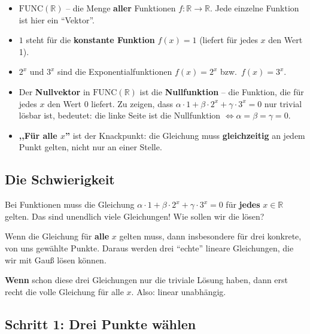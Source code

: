 \documentclass[a4paper,12pt]{article}
\begin{document}
\begin{begriffe}
\begin{itemize}[leftmargin=*, nosep]
    \item $\text{FUNC}(\mathbb{R})$ -- die Menge \textbf{aller} Funktionen $f : \mathbb{R} \to \mathbb{R}$. Jede einzelne Funktion ist hier ein ``Vektor''.
    \item $1$ steht f\"ur die \textbf{konstante Funktion} $f(x) = 1$ (liefert f\"ur jedes $x$ den Wert 1).
    \item $2^x$ und $3^x$ sind die Exponentialfunktionen $f(x) = 2^x$ bzw.\ $f(x) = 3^x$.
    \item Der \textbf{Nullvektor} in $\text{FUNC}(\mathbb{R})$ ist die \textbf{Nullfunktion} -- die Funktion, die f\"ur jedes $x$ den Wert 0 liefert. Zu zeigen, dass $\alpha \cdot 1 + \beta \cdot 2^x + \gamma \cdot 3^x = 0$ nur trivial l\"osbar ist, bedeutet: die linke Seite ist die Nullfunktion $\Leftrightarrow \alpha = \beta = \gamma = 0$.
    \item \textbf{,,F\"ur alle $x$''} ist der Knackpunkt: die Gleichung muss \textbf{gleichzeitig} an jedem Punkt gelten, nicht nur an einer Stelle.
\end{itemize}
\end{begriffe}

\subsection*{Die Schwierigkeit}

Bei Funktionen muss die Gleichung $\alpha \cdot 1 + \beta \cdot 2^x + \gamma \cdot 3^x = 0$ f\"ur \textbf{jedes} $x \in \mathbb{R}$ gelten. Das sind unendlich viele Gleichungen! Wie sollen wir die l\"osen?

\begin{merkbox}[title={Der Trick: An Punkten auswerten}]
Wenn die Gleichung f\"ur \textbf{alle} $x$ gelten muss, dann insbesondere f\"ur drei konkrete, von uns gew\"ahlte Punkte. Daraus werden drei ``echte'' lineare Gleichungen, die wir mit Gau\ss{} l\"osen k\"onnen.

\medskip
\textbf{Wenn} schon diese drei Gleichungen nur die triviale L\"osung haben, dann erst recht die volle Gleichung f\"ur alle $x$. Also: linear unabh\"angig.
\end{merkbox}

\subsection*{Schritt 1: Drei Punkte w\"ahlen}
\end{document}
